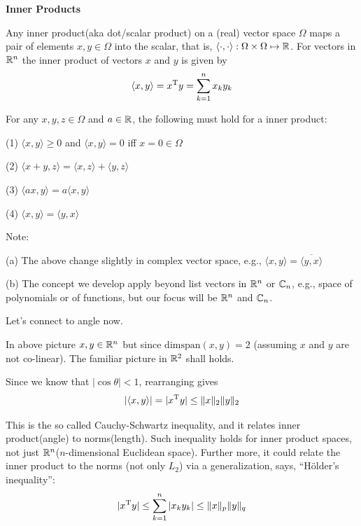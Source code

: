 \vspace{0.5cm}
\noindent\textbf{Inner Products}

Any inner product(aka dot/scalar product) on a (real) vector space $\Omega$ maps a pair of elements $x, y\in\Omega$ into the scalar, that is, $\langle\cdot,\cdot\rangle:\Omega\times\Omega\mapsto\mathbb{R}$. For vectors in $\mathbb{R}^{n}$ the inner product of vectors $x$ and $y$ is given by 
$$\langle x,y\rangle=x^{{\rm T}}y=\sum_{k=1}^{n}x_{k}y_{k}$$


For any $x, y, z\in\Omega$ and $a\in\mathbb{R}$, the following must hold for a inner product:

(1) $\langle x,y\rangle\geq 0$ and $\langle x,y\rangle=0$ iff $x=0\in\Omega$

(2) $\langle x+y,z\rangle=\langle x,z\rangle+\langle y,z\rangle$

(3) $\langle ax,y\rangle=a\langle x,y\rangle$

(4) $\langle x,y\rangle=\langle y,x\rangle$

\vspace{0.2cm}
Note:

(a) The above change slightly in complex vector space, e.g., $\langle x,y\rangle=\overline{\langle y,x\rangle}$

(b) The concept we develop apply beyond list vectors in $\mathbb{R}^{n}$ or $\mathbb{C}_{n}$, e.g., space of polynomials or of functions, but our focus will be $\mathbb{R}^{n}$ and $\mathbb{C}_{n}$.


\vspace{0.5cm}
Let's connect to angle now.

\begin{figure}
	\centering
	\resizebox{7.5cm}{3cm}{}
	\caption{}
	\label{}
\end{figure}

In above picture $x, y\in\mathbb{R}^{n}$ but since $\text{dim}{\text{span}({x, y})}=2$ (assuming $x$ and $y$ are not co-linear). The familiar picture in $\mathbb{R}^{2}$ shall holds.

Since we know that $\vert\cos\theta\vert <1$, rearranging gives
$$\vert\langle x,y\rangle\vert =\vert x^{{\rm T}}y\vert \leq \Vert x\Vert_{2} \Vert y\Vert_{2}$$

This is the so called Cauchy-Schwartz inequality, and it relates inner product(angle) to norms(length). Such inequality holds for inner product spaces, not just $\mathbb{R}^{n}$($n$-dimensional Euclidean space). Further more, it could relate the inner product to the norms (not only $L_{2}$) via a generalization, says, ``H\"older's inequality'':
$$\vert x^{{\rm T}}y\vert\leq \sum_{k=1}^{n}\vert x_{k}y_{k}\vert \leq \Vert x\Vert_{p}\Vert y\Vert_{q}$$

